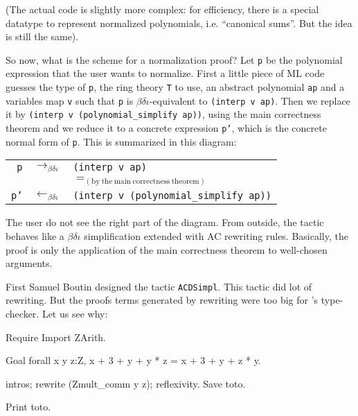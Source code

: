 (The actual code is slightly more complex: for efficiency,
there is a special datatype to represent normalized polynomials,
i.e. ``canonical sums''. But the idea is still the same).

So now, what is the scheme for a normalization proof? Let \texttt{p}
be the polynomial expression that the user wants to normalize. First a
little piece of ML code guesses the type of \texttt{p}, the ring
theory \texttt{T} to use, an abstract polynomial \texttt{ap} and a
variables map \texttt{v} such that \texttt{p} is
$\beta\delta\iota$-equivalent to \verb|(interp v ap)|. Then we
replace it by \verb|(interp v (polynomial_simplify ap))|, using the
main correctness theorem and we reduce it to a concrete expression
\texttt{p'}, which is the concrete normal form of
\texttt{p}. This is summarized in this diagram:
\begin{center}
\begin{tabular}{rcl}
\texttt{p} & $\rightarrow_{\beta\delta\iota}$  
   & \texttt{(interp v ap)} \\
 & & $=_{\mathrm{(by\ the\ main\ correctness\ theorem)}}$ \\
\texttt{p'} 
   & $\leftarrow_{\beta\delta\iota}$ 
   & \texttt{(interp v (polynomial\_simplify ap))}
\end{tabular}
\end{center}
The user do not see the right part of the diagram. 
From outside, the tactic behaves like a
$\beta\delta\iota$ simplification extended with AC rewriting rules.
Basically, the proof is only the application of the main
correctness theorem to well-chosen arguments.


First Samuel Boutin designed the tactic \texttt{ACDSimpl}. 
This tactic did lot of rewriting. But the proofs
terms generated by rewriting were too big for \Coq's type-checker.
Let us see why:

\begin{coq_eval}
Require Import ZArith.
\end{coq_eval}
\begin{coq_example}
Goal forall x y z:Z, x + 3 + y + y * z = x + 3 + y + z * y.
\end{coq_example}
\begin{coq_example*}
intros; rewrite (Zmult_comm y z); reflexivity.
Save toto.
\end{coq_example*}
\begin{coq_example}
Print  toto.
\end{coq_example}


